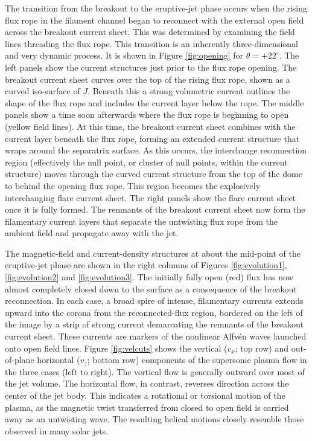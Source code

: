 \documentclass[twocolumn]{aastex6}
\begin{document}
The transition from the breakout to the eruptive-jet phase occurs when the rising flux rope in the filament channel began to reconnect with the external open field across the breakout current sheet. This was determined by examining the field lines threading the flux rope. This transition is an inherently three-dimensional and very dynamic process. It is shown in Figure \ref{fig:opening} for $\theta = + 22^\circ$. The left panels show the current structures just prior to the flux rope opening. The breakout current sheet curves over the top of the rising flux rope, shown as a curved iso-surface of $J$. Beneath this a strong volumetric current outlines the shape of the flux rope and includes the current layer below the rope. The middle panels show a time soon afterwards where the flux rope is beginning to open (yellow field lines). At this time, the breakout current sheet combines with the current layer beneath the flux rope, forming an extended current structure that wraps around the separatrix surface. As this occurs, the interchange reconnection region (effectively the null point, or cluster of null points, within the current structure) moves through the curved current structure from the top of the dome to behind the opening flux rope. This region becomes the explosively interchanging flare current sheet. The right panels show the flare current sheet once it is fully formed. The remnants of the breakout current sheet now form the filamentary current layers that separate the untwisting flux rope from the ambient field and propagate away with the jet.

The magnetic-field and current-density structures at about the mid-point of the eruptive-jet phase are shown in the right columns of Figures \ref{fig:evolution1}, \ref{fig:evolution2} and \ref{fig:evolution3}. The initially fully open (red) flux has now almost completely closed down to the surface as a consequence of the breakout reconnection. In each case, a broad spire of intense, filamentary currents extends upward into the corona from the reconnected-flux region, bordered on the left of the image by a strip of strong current demarcating the remnants of the breakout current sheet. These currents are markers of the nonlinear Alfv\'{e}n waves launched onto open field lines. Figure \ref{fig:velcuts} shows the vertical ($v_x$; top row) and out-of-plane horizontal ($v_z$; bottom row) components of the supersonic plasma flow in the three cases (left to right). The vertical flow is generally outward over most of the jet volume. The horizontal flow, in contrast, reverses direction across the center of the jet body. This indicates a rotational or torsional motion of the plasma, as the magnetic twist transferred from closed to open field is carried away as an untwisting wave. The resulting helical motions closely resemble those observed in many solar jets.
\end{document}
